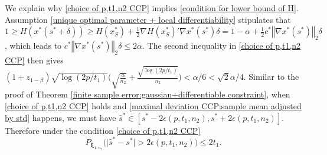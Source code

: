 \documentclass[mnsc,blindrev]{informs4} %
\newcommand{\norm}[1]{\left \Vert #1 \right\Vert}
\begin{document}
We explain why \eqref{choice of p,t1,n2 CCP} implies \eqref{condition for lower bound of H}. Assumption \ref{unique optimal parameter + local differentiability} stipulates that $1\geq H(x^*(s^*+\delta))\geq H(x^*_S)+\frac{1}{2}\nabla H(x^*_S)'\nabla x^*(s^*)\delta=1-\alpha+\frac{1}{2}c^*\norm{\nabla x^*(s^*)}_2\delta$, which leads to $c^*\norm{\nabla x^*(s^*)}_2\delta\leq 2\alpha$. The second inequality in \eqref{choice of p,t1,n2 CCP} then gives $(1+z_{1-\beta})\sqrt{\log (2p/t_1)}\big(\sqrt{\frac{\alpha}{n_2}}+\frac{\sqrt{\log (2p/t_1)}}{n_2}\big)<\alpha/6<\sqrt{2}\alpha/4$. Similar to the proof of Theorem \ref{finite sample error:gaussian+differentiable constraint}, when \eqref{choice of p,t1,n2 CCP} holds and \eqref{maximal deviation CCP:sample mean adjusted by std} happens, we must have $\hat s^*\in[s^*-2\epsilon(p,t_1,n_2),s^*+2\epsilon(p,t_1,n_2)]$. Therefore under the condition \eqref{choice of p,t1,n2 CCP}
\begin{equation}\label{maximal deviation CCP:parameter}
   P_{\bm{\xi}_{1:n_2}}\big( \lvert \hat s^*-s^*\rvert>2\epsilon(p,t_1,n_2)\big)\leq 2t_1.
\end{equation}
\end{document}
